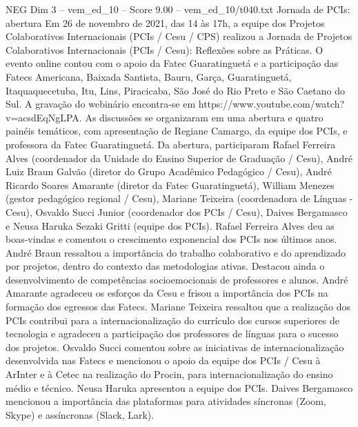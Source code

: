 \begin{textsample}{NEG Dim 3 – vem\_ed\_10 – Score 9.00 – vem\_ed\_10/t040.txt}  \label{ex:f3_neg_131}
Jornada de PCIs: abertura Em 26 de novembro de 2021, das 14 às 17h, a equipe dos Projetos Colaborativos Internacionais (PCIs / Cesu / CPS) realizou a Jornada de Projetos Colaborativos Internacionais (PCIs / Cesu): Reflexões sobre as Práticas.
O evento online contou com o apoio da Fatec Guaratinguetá e a participação das Fatecs Americana, Baixada Santista, Bauru, Garça, Guaratinguetá, Itaquaquecetuba, Itu, Lins, Piracicaba, São José do Rio Preto e São Caetano do Sul.
A gravação do webinário encontra-se em https://www.youtube.com/watch?v=acsdEqNgLPA.
As discussões se organizaram em uma abertura e quatro painéis temáticos, com apresentação de Regiane Camargo, da equipe dos PCIs, e professora da Fatec Guaratinguetá.
Da abertura, participaram Rafael Ferreira Alves (coordenador da Unidade do Ensino Superior de Graduação / Cesu), André Luiz Braun Galvão (diretor do Grupo Acadêmico Pedagógico / Cesu), André Ricardo Soares Amarante (diretor da Fatec Guaratinguetá), William Menezes (gestor pedagógico regional / Cesu), Mariane Teixeira (coordenadora de Línguas - Cesu), Osvaldo Succi Junior (coordenador dos PCIs / Cesu), Daives Bergamasco e Neusa Haruka Sezaki Gritti (equipe dos PCIs).
Rafael Ferreira Alves deu as boas-vindas e comentou o crescimento exponencial dos PCIs nos últimos anos.
André Braun ressaltou a importância do trabalho colaborativo e do aprendizado por projetos, dentro do contexto das metodologias ativas.
Destacou ainda o desenvolvimento de competências socioemocionais de professores e alunos.
André Amarante agradeceu os esforços da Cesu e frisou a importância dos PCIs na formação dos egressos das Fatecs.
Mariane Teixeira ressaltou que a realização dos PCIs contribui para a internacionalização do currículo dos cursos superiores de tecnologia e agradeceu a participação dos professores de línguas para o sucesso dos projetos.
Osvaldo Succi comentou sobre as iniciativas de internacionalização desenvolvida nas Fatecs e mencionou o apoio da equipe dos PCIs / Cesu à ArInter e à Cetec na realização do Procin, para internacionalização do ensino médio e técnico.
Neusa Haruka apresentou a equipe dos PCIs.
Daives Bergamasco mencionou a importância das plataformas para atividades síncronas (Zoom, Skype) e assíncronas (Slack, Lark).

\end{textsample}
